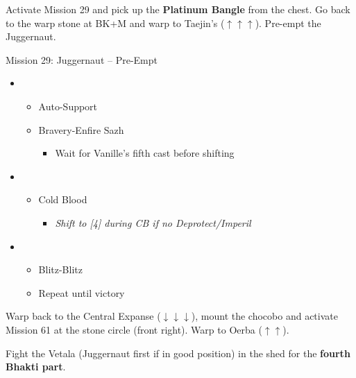 Activate Mission 29 and pick up the \textbf{Platinum Bangle} from the chest.
Go back to the warp stone at BK+M and warp to Taejin's ($\uparrow\uparrow\uparrow$).
Pre-empt the Juggernaut.

\begin{battle}{Mission 29: Juggernaut -- Pre-Empt}
	\begin{itemize}
		\item \fourth
			\begin{itemize}
				\item Auto-Support
				\item Bravery-Enfire Sazh
					\begin{itemize}
						\item Wait for Vanille's fifth cast before shifting
					\end{itemize}
			\end{itemize}
		\item \sixth
			\begin{itemize}
				\item Cold Blood
					\begin{itemize}
						\item \textit{Shift to [4] during CB if no Deprotect/Imperil}
					\end{itemize}
			\end{itemize}
		\item \first
			\begin{itemize}
				\item Blitz-Blitz
				\item Repeat until victory
			\end{itemize}
	\end{itemize}
\end{battle}

Warp back to the Central Expanse ($\downarrow\downarrow\downarrow$), mount the chocobo and activate Mission 61 at the stone circle (front right).
Warp to Oerba ($\uparrow\uparrow$).

Fight the Vetala (Juggernaut first if in good position) in the shed for the \textbf{fourth Bhakti part}.

